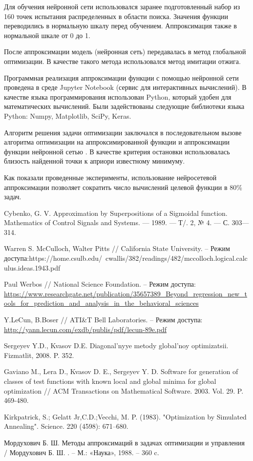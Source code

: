 \documentclass[11pt, oneside, a4paper]{article}
\begin{document}
Для обучения нейронной сети использовался заранее подготовленный набор из 160 точек испытания распределенных в области поиска.
Значения функции переводились в нормальную шкалу перед обучением. Аппроксимация также в нормальной шкале от 0 до 1.


После аппроксимации модель (нейронная сеть) передавалась в метод глобальной оптимизации.
В качестве такого метода использовался метод имитации отжига\cite{fio_bib7}.


Программная реализация аппроксимации функции с помощью нейронной сети проведена в среде Jupyter Notebook (сервис для интерактивных вычислений). В качестве языка программирования использован Python, который удобен для математических вычислений. Были задействованы следующие библиотеки языка Python: Numpy, Matplotlib, SciPy, Keras.


Алгоритм решения задачи оптимизации заключался в последовательном вызове алгоритма оптимизации на аппроксимированной функции и аппроксимации функции нейронной сетью \cite{fio_bib8}. В качестве критерия остановки использовалась близость найденной точки к априори известному минимуму.

Как показали проведенные эксперименты, использование нейросетевой аппроксимации позволяет сократить число вычислений целевой функции в 80\% задач.



\begin{biblio}

 Cybenko, G. V. Approximation by Superpositions of a Sigmoidal function. Mathematics of Control Signals and Systems. — 1989. — Т/. 2, № 4. — С. 303—314.

 Warren S. McCulloch, Walter Pitts // California State University. – Режим доступа:https://home.csulb.edu/~cwallis/382/readings/482/mccolloch.logical.calculus.ideas.1943.pdf 

 Paul Werbos // National Science Foundation. – Режим доступа: \url{https://www.researchgate.net/publication/35657389_Beyond_regression_new_tools_for_prediction_and_analysis_in_the_behavioral_sciences}

 Y.LeCun, B.Boser // ATI\&T Bell Laboratories. – Режим доступа: \url{http://yann.lecun.com/exdb/publis/pdf/lecun-89e.pdf}

 Sergeyev Y.D., Kvasov D.E. Diagonal'nyye metody global'noy optimizatsii. Fizmatlit, 2008. P. 352.

 Gaviano M., Lera D., Kvasov D. E., Sergeyev Y. D. Software for generation of classes of test functions with known local and global minima for global optimization // ACM Transactions on Mathematical Software. 2003. Vol. 29. P. 469-480.

 Kirkpatrick, S.; Gelatt Jr,C.D.;Vecchi, M. P. (1983). "Optimization by Simulated Annealing". Science. 220 (4598): 671–680.

 Мордухович Б. Ш. Методы аппроксимаций в задачах оптимизации и управления / Мордухович Б. Ш. . – М.: «Наука», 1988. – 360 c.

\end{biblio}

\end{document}
